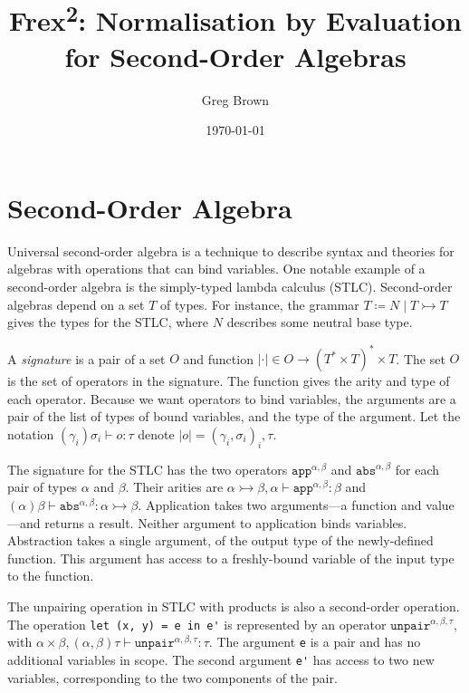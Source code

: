 \documentclass[11pt,a4paper]{article}
\author{Greg Brown}
\date{\today}
\title{Frex\textsuperscript{2}: Normalisation by Evaluation for Second-Order Algebras}
\begin{document}
\maketitle

\section{Second-Order Algebra}

Universal second-order algebra is a technique to describe syntax and theories
for algebras with operations that can bind variables. One notable example of a
second-order algebra is the simply-typed lambda calculus (STLC). Second-order
algebras depend on a set \(T\) of types. For instance, the grammar \(T \coloneqq
{N \mid {T \rightarrowtail T}}\) gives the types for the STLC, where \(N\) describes some neutral
base type.

A \emph{signature} is a pair of a set \(O\) and function \({\vert\cdot\vert} \in {O \to {{(T^* \times
T)}^* \times T}}\). The set \(O\) is the set of operators in the signature. The
function gives the arity and type of each operator. Because we want operators to
bind variables, the arguments are a pair of the list of types of bound
variables, and the type of the argument. Let the notation \({(\gamma_i)\sigma_i} \vdash o : \tau\)
denote \({\vert o \vert} = {{(\gamma_i , \sigma_i)}_i , \tau}\).

The signature for the STLC has the two operators \(\mathtt{app}^{\alpha,\beta}\) and
\(\mathtt{abs}^{\alpha,\beta}\) for each pair of types \(\alpha\) and \(\beta\). Their arities are
\({{\alpha \rightarrowtail \beta}, \alpha} \vdash \mathtt{app}^{\alpha,\beta} : \beta\) and \({(\alpha)\beta} \vdash \mathtt{abs}^{\alpha,\beta} : {\alpha
\rightarrowtail \beta}\).  Application takes two arguments---a function and value---and returns a
result. Neither argument to application binds variables. Abstraction takes a
single argument, of the output type of the newly-defined function. This argument
has access to a freshly-bound variable of the input type to the function.

The unpairing operation in STLC with products is also a second-order operation.
The operation \verb|let (x, y) = e in e'| is represented by an operator
\(\mathtt{unpair}^{\alpha,\beta,\tau}\), with \({{\alpha \times \beta}, {(\alpha, \beta)\tau}} \vdash
\mathtt{unpair}^{\alpha,\beta,\tau} : \tau\). The argument \verb|e| is a pair and has no
additional variables in scope. The second argument \verb|e'| has access to two
new variables, corresponding to the two components of the pair.
\end{document}
